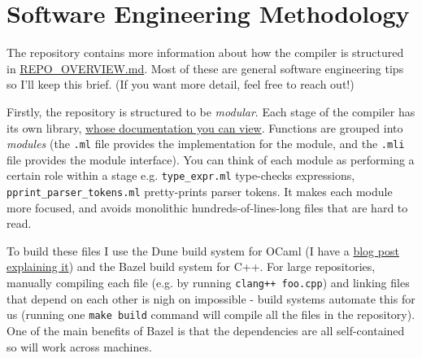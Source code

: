 %
%
%
%

\hypertarget{software-engineering-methodology}{%
\section{\texorpdfstring{\protect\hyperlink{software-engineering-methodology}{}Software
Engineering
Methodology}{Software Engineering Methodology}}\label{software-engineering-methodology}}

The repository contains more information about how the compiler is
structured in
\href{https://github.com/mukul-rathi/bolt/blob/master/REPO_OVERVIEW.md}{REPO\_OVERVIEW.md}.
Most of these are general software engineering tips so I'll keep this
brief. (If you want more detail, feel free to reach out!)

Firstly, the repository is structured to be \emph{modular}. Each stage
of the compiler has its own library,
\href{http://mukul-rathi.github.io/bolt}{whose documentation you can
view}. Functions are grouped into \emph{modules} (the \texttt{.ml} file
provides the implementation for the module, and the \texttt{.mli} file
provides the module interface). You can think of each module as
performing a certain role within a stage e.g. \texttt{type\_expr.ml}
type-checks expressions, \texttt{pprint\_parser\_tokens.ml}
pretty-prints parser tokens. It makes each module more focused, and
avoids monolithic hundreds-of-lines-long files that are hard to read.

To build these files I use the Dune build system for OCaml (I have a
\href{https://mukulrathi.com/ocaml-tooling-dune/}{blog post explaining
it}) and the Bazel build system for C++. For large repositories,
manually compiling each file (e.g. by running \texttt{clang++\ foo.cpp})
and linking files that depend on each other is nigh on impossible -
build systems automate this for us (running one \texttt{make\ build}
command will compile all the files in the repository). One of the main
benefits of Bazel is that the dependencies are all self-contained so
will work across machines.

